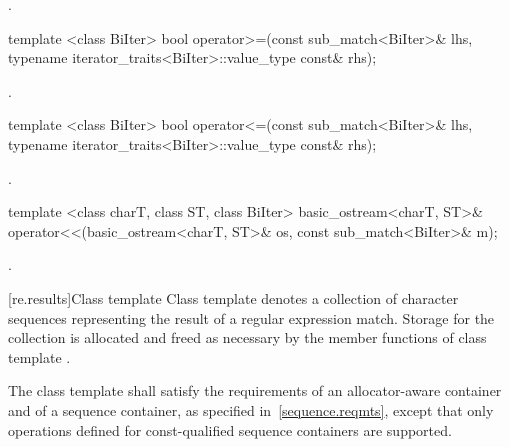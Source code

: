 \begin{itemdescr}
\pnum
\returns {}.
\end{itemdescr}

%
%
\begin{itemdecl}
template <class BiIter> 
  bool operator>=(const sub_match<BiIter>& lhs, 
                  typename iterator_traits<BiIter>::value_type const& rhs); 
\end{itemdecl}

\begin{itemdescr}
\pnum
\returns {}.
\end{itemdescr}

%
%
\begin{itemdecl}
template <class BiIter> 
  bool operator<=(const sub_match<BiIter>& lhs, 
                  typename iterator_traits<BiIter>::value_type const& rhs); 
\end{itemdecl}

\begin{itemdescr}
\pnum
\returns {}.
\end{itemdescr}

%
%
%
\begin{itemdecl}
template <class charT, class ST, class BiIter>
  basic_ostream<charT, ST>&
  operator<<(basic_ostream<charT, ST>& os, const sub_match<BiIter>& m); 
\end{itemdecl}

\begin{itemdescr}
\pnum\returns  {}.
\end{itemdescr}

[re.results]{Class template }
\pnum
{}%
Class template  denotes a collection of character
sequences representing the result of a regular expression
match. Storage for the collection is allocated and freed as necessary
by the member functions of class template .

\pnum
{}%
%
%
The class template  shall satisfy the requirements of an
allocator-aware container and of a sequence container, as specified
in~\ref{sequence.reqmts}, except that only operations defined for const-qualified
sequence containers are supported.

